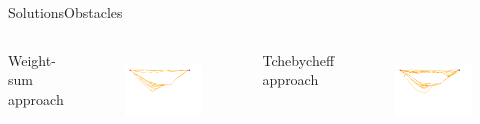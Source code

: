 \begin{frame}{Solutions}{Obstacles}
\begin{columns}
	{ Weight-sum approach}
	\begin{figure}
		\centering
		\includegraphics[width=\linewidth]{figure/sim4-obstacle/MORRTstar01-1-ALL.png}
		\label{fig:sim:02:sol1}
	\end{figure}
	{ Tchebycheff approach}
	\begin{figure}
		\centering
		\includegraphics[width=\linewidth]{figure/sim5-obstacle/MORRTstar01-1-ALL.png}
		\label{fig:sim:02:sol2}
	\end{figure}
\end{columns}
\end{frame}

